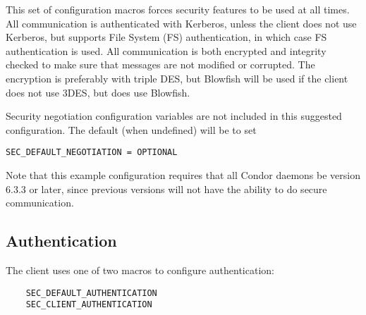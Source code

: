 This set of configuration macros forces security features
to be used at all times.
All communication is authenticated with Kerberos, unless the client
does not use Kerberos, but supports File System (FS) authentication,
in which case FS authentication is used.
All communication is both encrypted and integrity checked to make sure
that messages are not modified or corrupted. 
The encryption is preferably with triple DES, but Blowfish will be
used if the client does not use 3DES, but does use Blowfish.

Security negotiation configuration variables are not included in this
suggested configuration.
The default (when undefined) will be to set
\begin{verbatim}
SEC_DEFAULT_NEGOTIATION = OPTIONAL
\end{verbatim}

Note that this example configuration requires that all Condor daemons be
version 6.3.3 or later, since previous versions will not have
the ability to do secure communication.

\subsection{\label{sec:Security-Authentication}Authentication}

The client uses one of two macros to configure authentication:
\begin{verbatim}
    SEC_DEFAULT_AUTHENTICATION
    SEC_CLIENT_AUTHENTICATION
\end{verbatim}


